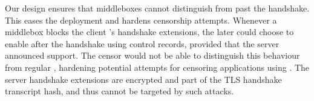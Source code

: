 Our design ensures that middleboxes cannot distinguish \tcpls from \tls past the
handshake. This eases the \tcpls deployment and hardens censorship attempts.
Whenever a middlebox blocks the client \tcpls's handshake extensions, the later
could choose to enable \tcpls after the handshake using \tcpls control records,
provided that the server announced \tcpls support.  The censor would not be able
to distinguish this behaviour from regular \tls, hardening potential
attempts for censoring applications using \tcpls. The server handshake
extensions are encrypted and part of the TLS handshake transcript hash,  and 
thus cannot be targeted by such attacks.







